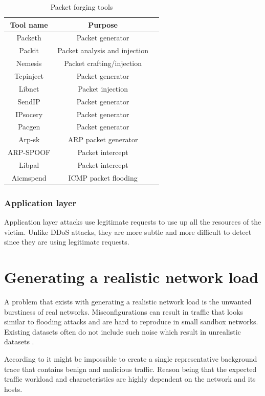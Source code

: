 \documentclass[conference]{IEEEtran}
\begin{document}
\begin{table}[htbp]
\caption{Packet forging tools \cite{b1}} 
\centering
\begin{tabular}{ | c | c | c |}
\hline
Tool name & Purpose \\
\hline
Packeth & Packet generator	 \\
Packit & Packet analysis and injection	 \\
Nemesis & Packet crafting/injection	 \\
Tcpinject & Packet generator	 \\
Libnet & Packet injection	 \\
SendIP & Packet generator	 \\
IPsocery & Packet generator	 \\
Pacgen & Packet generator	 \\
Arp-sk & ARP packet generator	 \\
ARP-SPOOF & Packet intercept	 \\
Libpal & Packet intercept	 \\
Aicmspend & ICMP packet flooding	\\
\hline
\end{tabular}
\label{table:packetforging-tools}
\end{table}

\smallskip
\subsubsection{Application layer}
Application layer attacks use legitimate requests to use up all the resources of the victim. Unlike DDoS attacks, they are more subtle and more difficult to detect since they are using legitimate requests. 

\smallskip
\section{Generating a realistic network load}
A problem that exists with generating a realistic network load is the unwanted burstiness of real networks. Misconfigurations can result in traffic that looks similar to flooding attacks \cite{b10} and are hard to reproduce in small sandbox networks. Existing datasets often do not include such noise which result in unrealistic datasets \cite{b10}.
 
\smallskip According to \cite{b10} it might be impossible to create a single representative background trace that contains benign and malicious traffic. Reason being that the expected traffic workload and characteristics are highly dependent on the network and its hosts.
\end{document}
